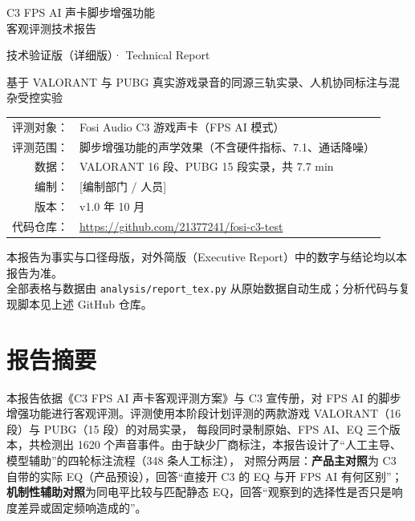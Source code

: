 \documentclass[11pt,a4paper]{ctexart}
\begin{document}
\begin{titlepage}
\centering\vspace*{35mm}
{\Huge\heiti C3 FPS AI 声卡脚步增强功能\\[10pt] 客观评测技术报告\par}
\vspace{8mm}
{\Large 技术验证版（详细版）· Technical Report\par}
\vspace{10mm}
{\large 基于 VALORANT 与 PUBG 真实游戏录音的同源三轨实录、人机协同标注与混杂受控实验\par}
\vspace{40mm}
\begin{tabular}{rl}
评测对象： & Fosi Audio C3 游戏声卡（FPS AI 模式）\\
评测范围： & 脚步增强功能的声学效果（不含硬件指标、7.1、通话降噪）\\
数据： & VALORANT 16 段、PUBG 15 段实录，共 7.7 min\\
编制： & [编制部门 / 人员]\\
版本： & v1.0\quad 2026 年 10 月\\
代码仓库： & \url{https://github.com/21377241/fosi-c3-test}\\
\end{tabular}
\vfill
{\small 本报告为事实与口径母版，对外简版（Executive Report）中的数字与结论均以本报告为准。\\
全部表格与数据由 \texttt{analysis/report\_tex.py} 从原始数据自动生成；分析代码与复现脚本见上述 GitHub 仓库。\par}
\end{titlepage}

\tableofcontents
\clearpage

\section*{报告摘要}
本报告依据《C3 FPS AI 声卡客观评测方案》与 C3 宣传册，对 FPS AI 的脚步增强功能进行客观评测。评测使用本阶段计划评测的两款游戏 VALORANT（16 段）与 PUBG（15 段）的对局实录，
每段同时录制原始、FPS AI、EQ 三个版本，共检测出 1620 个声音事件。由于缺少厂商标注，本报告设计了“人工主导、模型辅助”的四轮标注流程（348 条人工标注），
对照分两层：\textbf{产品主对照}为 C3 自带的实际 EQ（产品预设），回答“直接开 C3 的 EQ 与开 FPS AI 有何区别”；
\textbf{机制性辅助对照}为同电平比较与匹配静态 EQ，回答“观察到的选择性是否只是响度差异或固定频响造成的”。
\end{document}
